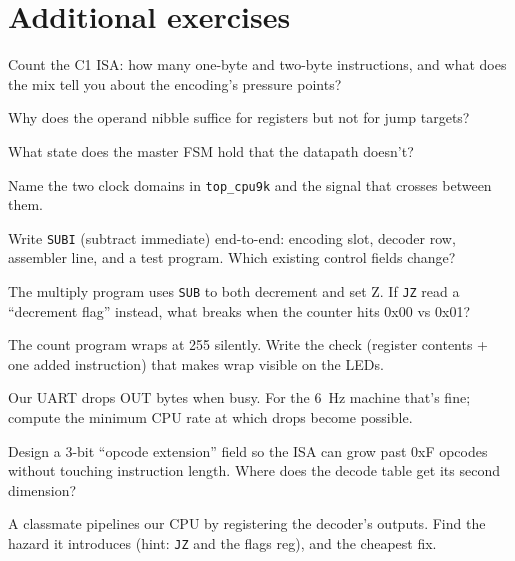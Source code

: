 \section*{Additional exercises}

\begin{exercise}[easy]
Count the C1 ISA: how many one-byte and two-byte instructions, and
what does the mix tell you about the encoding's pressure points?
\end{exercise}
\begin{exercise}[easy]
Why does the operand nibble suffice for registers but not for jump
targets?
\end{exercise}
\begin{exercise}[easy]
What state does the master FSM hold that the datapath doesn't?
\end{exercise}
\begin{exercise}[easy]
Name the two clock domains in \texttt{top\_cpu9k} and the signal that
crosses between them.
\end{exercise}
\begin{exercise}[medium]
Write \texttt{SUBI} (subtract immediate) end-to-end: encoding slot,
decoder row, assembler line, and a test program. Which existing
control fields change?
\end{exercise}
\begin{exercise}[medium]
The multiply program uses \texttt{SUB} to both decrement and set Z.
If \texttt{JZ} read a ``decrement flag'' instead, what breaks when the
counter hits 0x00 vs 0x01?
\end{exercise}
\begin{exercise}[medium]
The count program wraps at 255 silently. Write the check (register
contents + one added instruction) that makes wrap visible on the
LEDs.
\end{exercise}
\begin{exercise}[medium]
Our UART drops OUT bytes when busy. For the 6~Hz machine that's fine;
compute the minimum CPU rate at which drops become possible.
\end{exercise}
\begin{exercise}[hard]
Design a 3-bit ``opcode extension'' field so the ISA can grow past
0xF opcodes without touching instruction length. Where does the
decode table get its second dimension?
\end{exercise}
\begin{exercise}[hard]
A classmate pipelines our CPU by registering the decoder's outputs.
Find the hazard it introduces (hint: \texttt{JZ} and the flags reg),
and the cheapest fix.
\end{exercise}
